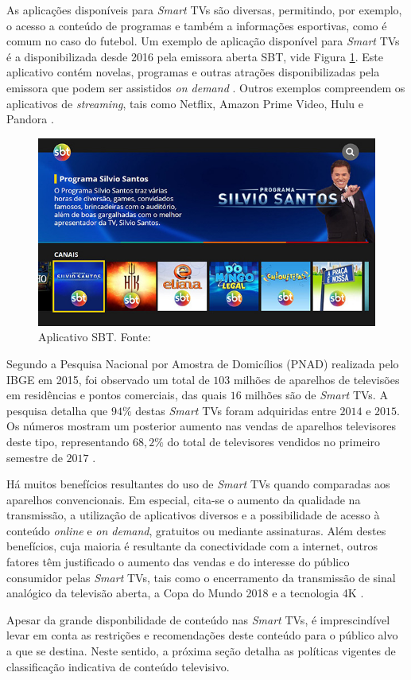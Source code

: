 As aplicações disponíveis para \emph{Smart} TVs são diversas, permitindo, por exemplo, o acesso a conteúdo de programas e também a informações esportivas, como é comum no caso do futebol. Um exemplo de aplicação disponível para \emph{Smart} TVs é a disponibilizada desde 2016 pela emissora aberta SBT, vide Figura \ref{fig:sbt_app}. Este aplicativo contém novelas, programas e outras atrações disponibilizadas pela emissora que podem ser assistidos \emph{on demand} \cite{sbt:tvconectada}. Outros exemplos compreendem os aplicativos de \emph{streaming}, tais como Netflix, Amazon Prime Video, Hulu e Pandora \cite{canaltech:streaming}.

\begin{figure}[!ht]
	\centering
	\includegraphics[width=\textwidth]{img/sbt_app.jpg}
	\caption{Aplicativo SBT. Fonte: \cite{sbt:tvconectada}}
	\label{fig:sbt_app}
\end{figure}

Segundo a Pesquisa Nacional por Amostra de Domicílios (PNAD) realizada pelo IBGE em 2015, foi observado um total de $103$ milhões de aparelhos de televisões em residências e pontos comerciais, das quais $16$ milhões são de \emph{Smart} TVs. A pesquisa detalha que $94\%$ destas \emph{Smart} TVs foram adquiridas entre $2014$ e $2015$. Os números mostram um posterior aumento nas vendas de aparelhos televisores deste tipo, representando $68,2\%$ do total de televisores vendidos no primeiro semestre de $2017$ \cite{pnad2015}.

Há muitos benefícios resultantes do uso de \emph{Smart} TVs quando comparadas aos aparelhos convencionais. Em especial, cita-se o aumento da qualidade na transmissão, a utilização de aplicativos diversos e a possibilidade de acesso à conteúdo \emph{online} e \emph{on demand}, gratuitos ou mediante assinaturas. Além destes benefícios, cuja maioria é resultante da conectividade com a internet, outros fatores têm justificado o aumento das vendas e do interesse do público consumidor pelas \emph{Smart} TVs, tais como o encerramento da transmissão de sinal analógico da televisão aberta, a Copa do Mundo 2018 e a tecnologia 4K \cite{leiajabuscasmart,correiopnad,estadao:explosaovideosonline}.

Apesar da grande disponbilidade de conteúdo nas \emph{Smart} TVs, é imprescindível levar em conta as restrições e recomendações deste conteúdo para o público alvo a que se destina. Neste sentido, a próxima seção detalha as políticas vigentes de classificação indicativa de conteúdo televisivo.
